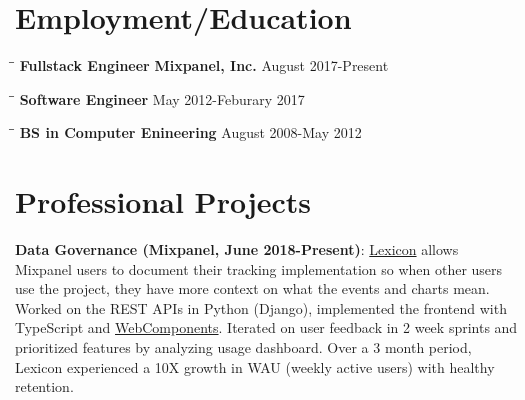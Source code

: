 \documentclass{res}
\begin{document}
 
\thispagestyle{empty} %
\address{\url{https://github.com/ksiondag}\\
ksiondag846@gmail.com\\
(520) 329-5081\\
Seattle, WA}


\begin{resume}
   
\section{Employment/Education} 
\vspace{-0.1in} 
  \begin{tabbing}
    \hspace{2.2in}\= \hspace{2.2in}\= \kill
    {\bf Fullstack Engineer} \> {\bf Mixpanel, Inc.}     \>August 2017-Present
  \end{tabbing}\vspace{-5pt}

  \vspace{-20pt}\begin{tabbing}
    \hspace{2.2in}\= \hspace{2.2in}\= \kill
    {\bf Software Engineer}  \> May 2012-Feburary 2017
  \end{tabbing}\vspace{-5pt}

  \vspace{-20pt}\begin{tabbing}
    \hspace{2.2in}\= \hspace{2.2in}\= \kill
    {\bf BS in Computer Enineering}  \> August 2008-May 2012\\
  \end{tabbing}\vspace{-5pt}


\section{Professional Projects}
  {\bf Data Governance (Mixpanel, June 2018-Present)}:
  \href{https://help.mixpanel.com/hc/en-us/articles/360001307806-Lexicon-Overview}{Lexicon} allows Mixpanel 
  users to document their tracking implementation so when other users use the project, they have more
  context on what the events and charts mean. Worked on the REST APIs in Python (Django), implemented the
  frontend with TypeScript and \href{https://github.com/mixpanel/panel}{WebComponents}. Iterated on user
  feedback in 2 week sprints and prioritized features by analyzing usage dashboard. Over a 3 month period,
  Lexicon experienced a 10X growth in WAU (weekly active users) with healthy retention.


\end{resume}
\end{document}
